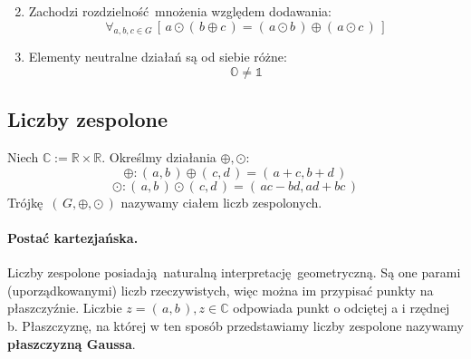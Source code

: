 \begin{definition}
\begin{enumerate}
\begin{equation*}
            \end{equation*}
        \item Zachodzi rozdzielność mnożenia względem dodawania:
            \begin{equation*}
                \forall_{a,b,c \in G} \, [\, a \odot (\, b \oplus c\,) = (\, a \odot b \,) \oplus (\, a \odot c\, )\,]
            \end{equation*}
        \item Elementy neutralne działań są od siebie różne:
            \begin{equation*}
                \mathds{O} \neq \mathds{1}
            \end{equation*}
    \end{enumerate}
\end{definition}
\subsection{Liczby zespolone}
\begin{definition}
    Niech $\mathds{C} := \mathds{R} \times \mathds{R}$. Określmy działania $\oplus ,\odot$:
    \begin{equation*}
        \oplus : (\,a,b\,)\oplus(\,c,d\,) = (\,a+c, b+d\,)
    \end{equation*}
    \begin{equation*}
        \odot : (\,a,b\,)\odot(\,c,d\,) = (\, ac-bd, ad+bc\,)
    \end{equation*}
    Trójkę $(\,G,\oplus,\odot\,)$ nazywamy ciałem liczb zespolonych.
\end{definition}

\paragraph{Postać kartezjańska.} Liczby zespolone posiadają naturalną interpretację geometryczną. Są one parami (uporządkowanymi) liczb rzeczywistych, więc można im przypisać punkty na płaszczyźnie. Liczbie $z = (\,a,b\,), z \in \mathds{C}$ odpowiada punkt o odciętej a i rzędnej b. Płaszczyznę, na której w ten sposób przedstawiamy liczby zespolone nazywamy \textbf{płaszczyzną Gaussa}.
\begin{center}
\end{center}
